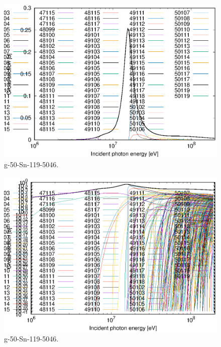 \begin{figure}
 \includegraphics[width=\linewidth]{eps/g_50-Sn-119_5046.eps}
  \caption{g-50-Sn-119-5046.}
\end{figure}
\begin{figure}
 \includegraphics[width=\linewidth]{eps-log/g_50-Sn-119_5046.eps}
 \caption{g-50-Sn-119-5046.}
\end{figure}
\newpage \clearpage

